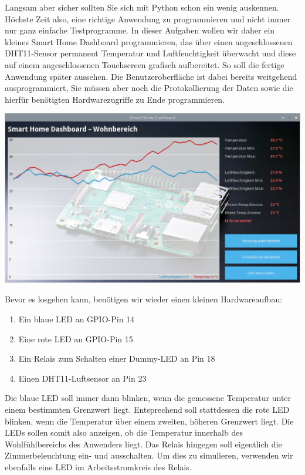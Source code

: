 \teilaufgabe
Langsam aber sicher sollten Sie sich mit Python schon ein wenig auskennen.
Höchste Zeit also, eine richtige Anwendung zu programmieren und nicht immer nur
ganz einfache Testprogramme. In dieser Aufgaben wollen wir daher ein kleines
Smart Home Dashboard programmieren, das über einen angeschlossenen DHT11-Sensor
permanent Temperatur und Luftfeuchtigkeit überwacht und diese auf einem
angeschlossenen Touchscreen grafisch aufbereitet. So soll die fertige Anwendung
später aussehen. Die Benutzeroberfläche ist dabei bereits weitgehend
ausprogrammiert, Sie müssen aber noch die Protokollierung der Daten sowie die
hierfür benötigten Hardwarezugriffe zu Ende programmieren.

\includegraphics[width=\textwidth]{3-python1/img/aufgabe-dashboard}

Bevor es losgehen kann, benötigen wir wieder einen kleinen Hardwareaufbau:

\begin{enumerate}
    \item Ein blaue LED an GPIO-Pin 14
    \item Eine rote LED an GPIO-Pin 15
    \item Ein Relais zum Schalten einer Dummy-LED an Pin 18
    \item Einen DHT11-Luftsensor an Pin 23
\end{enumerate}

Die blaue LED soll immer dann blinken, wenn die gemessene Temperatur unter
einem bestimmten Grenzwert liegt. Entsprechend soll stattdessen die rote LED
blinken, wenn die Temperatur über einem zweiten, höheren Grenzwert liegt.
Die LEDs sollen somit also anzeigen, ob die Temperatur innerhalb des
\glqq{}Wohlfühlbereichs\grqq{} des Anwenders liegt. \smiley Das Relais hingegen
soll eigentlich die Zimmerbeleuchtung ein- und ausschalten. Um dies zu simulieren,
verwenden wir ebenfalls eine LED im Arbeitsstromkreis des Relais.

